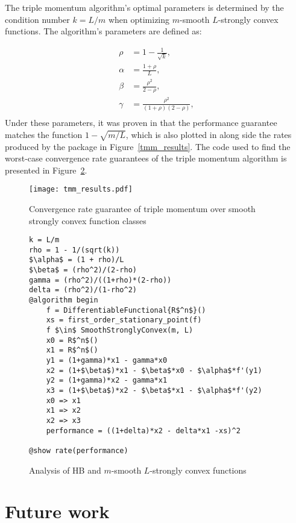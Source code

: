 The triple momentum algorithm's optimal parameters is determined by the condition number \( k = L/m \) when optimizing $m$-smooth $L$-strongly convex functions. The algorithm's parameters are defined as:

\[
\begin{aligned}
\rho &= 1 - \frac{1}{\sqrt{k}}, \\
\alpha &= \frac{1 + \rho}{L}, \\
\beta &= \frac{\rho^2}{2 - \rho}, \\
\gamma &= \frac{\rho^2}{(1 + \rho)(2 - \rho)}, \\
\end{aligned}
\]
Under these parameters, it was proven in \cite{TMM} that the performance guarantee matches the function $1-\sqrt{m/L}$, which is also plotted in along side the rates produced by the package in Figure~\ref{tmm_results}. The code used to find the worst-case convergence rate guarantees of the triple momentum algorithm is presented in Figure~\ref{tmm_code}.

\begin{figure}[h!]
    \centering
    \texttt{[image: tmm\_results.pdf]}
    \caption{Convergence rate guarantee of triple momentum over smooth strongly convex function classes}
    \label{hb_results}
\end{figure}

\begin{figure}[h!]
	\begin{lstlisting}[mathescape]
k = L/m
rho = 1 - 1/(sqrt(k))
$\alpha$ = (1 + rho)/L
$\beta$ = (rho^2)/(2-rho)
gamma = (rho^2)/((1+rho)*(2-rho))
delta = (rho^2)/(1-rho^2)
@algorithm begin
    f = DifferentiableFunctional{R$^n$}()
    xs = first_order_stationary_point(f)
    f $\in$ SmoothStronglyConvex(m, L)
    x0 = R$^n$()
    x1 = R$^n$()
    y1 = (1+gamma)*x1 - gamma*x0
    x2 = (1+$\beta$)*x1 - $\beta$*x0 - $\alpha$*f'(y1)
    y2 = (1+gamma)*x2 - gamma*x1
    x3 = (1+$\beta$)*x2 - $\beta$*x1 - $\alpha$*f'(y2)
    x0 => x1
    x1 => x2
    x2 => x3
    performance = ((1+delta)*x2 - delta*x1 -xs)^2
    
@show rate(performance)
\end{lstlisting}
\caption{Analysis of HB and $m$-smooth $L$-strongly convex functions}
\label{tmm_code}
\end{figure}

\section{Future work}

